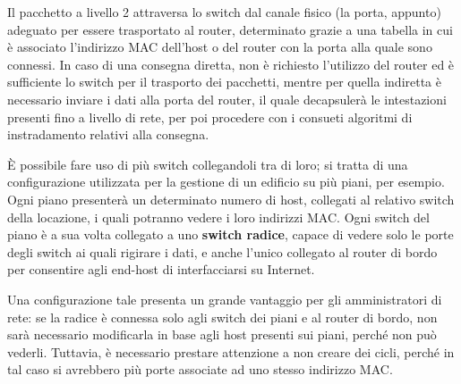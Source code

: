 \noindent Il pacchetto a livello 2 attraversa lo switch dal canale fisico (la porta, appunto) adeguato per essere trasportato al router, determinato
grazie a una tabella in cui è associato l'indirizzo MAC dell'host o del router con la porta alla quale sono connessi. In caso di una consegna diretta,
non è richiesto l'utilizzo del router ed è sufficiente lo switch per il trasporto dei pacchetti, mentre per quella indiretta è necessario inviare i dati
alla porta del router, il quale decapsulerà le intestazioni presenti fino a livello di rete, per poi procedere con i consueti algoritmi di instradamento
relativi alla consegna.\par
È possibile fare uso di più switch collegandoli tra di loro; si tratta di una configurazione utilizzata per la gestione di un edificio su più piani,
per esempio. Ogni piano presenterà un determinato numero di host, collegati al relativo switch della locazione, i quali potranno vedere i loro indirizzi
MAC. Ogni switch del piano è a sua volta collegato a uno \textbf{switch radice}, capace di vedere solo le porte degli switch ai quali rigirare i dati,
e anche l'unico collegato al router di bordo per consentire agli end-host di interfacciarsi su Internet.\par
Una configurazione tale presenta un grande vantaggio per gli amministratori di rete: se la radice è connessa solo agli switch dei piani e al router di
bordo, non sarà necessario modificarla in base agli host presenti sui piani, perché non può vederli. Tuttavia, è necessario prestare attenzione a non
creare dei cicli, perché in tal caso si avrebbero più porte associate ad uno stesso indirizzo MAC.\newline

